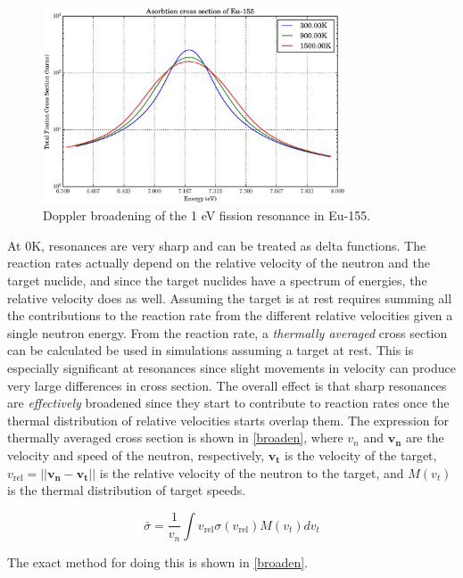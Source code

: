 \begin{figure}[h!]
  \centering
    \includegraphics[width=0.8\textwidth]{graphics/xs_eu_broaden.eps}
     \caption{Doppler broadening of the 1 eV fission resonance in Eu-155.  \label{xs_eu_broaden}}
\end{figure}

At 0K, resonances are very sharp and can be treated as delta functions.  The reaction rates actually depend on the relative velocity of the neutron and the target nuclide, and since the target nuclides have a spectrum of energies, the relative velocity does as well.  Assuming the target is at rest requires summing all the contributions to the reaction rate from the different relative velocities given a single neutron energy.  From the reaction rate, a \emph{thermally averaged} cross section can be calculated be used in simulations assuming a target at rest.  This is especially significant at resonances since slight movements in velocity can produce very large differences in cross section.  The overall effect is that sharp resonances are \emph{effectively} broadened since they start to contribute to reaction rates once the thermal distribution of relative velocities starts overlap them.   The expression for thermally averaged cross section is shown in \eqref{broaden}, where $v_n$ and $\boldsymbol{v_n}$ are the velocity and speed of the neutron, respectively, $\boldsymbol{v_t}$ is the velocity of the target, $v_\mathrm{rel} = || \boldsymbol{v_n} -\boldsymbol{v_t}||$ is the relative velocity of the neutron to the target, and $M(v_t)$ is the thermal distribution of target speeds.

\begin{equation}
\bar{\sigma} = \frac{1}{v_n} \int v_\mathrm{rel} \sigma(v_\mathrm{rel}) M(v_t) dv_t
\label{broaden}
\end{equation}

The exact method for doing this is shown in \eqref{broaden}\cite{Cullen_Weisbin_1976}.

